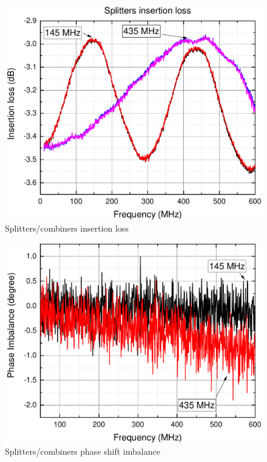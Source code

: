 \begin{figure}
    \centering
    \includegraphics[width=0.6\paperwidth]{img/5/splitter_amplitude.pdf}
    \caption{Splitters/combiners insertion loss}
    \label{splitter_amplitude}
\end{figure}

\begin{figure}
    \centering
    \includegraphics[width=0.6\paperwidth]{img/5/splitter_phase.pdf}
    \caption{Splitters/combiners phase shift imbalance}
    \label{splitter_phase}
\end{figure}

